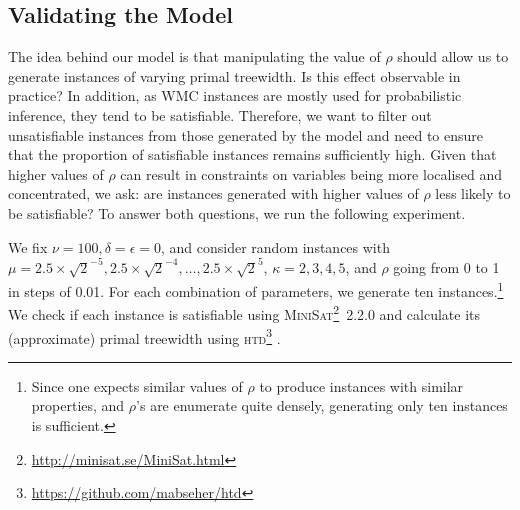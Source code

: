 



\subsection{Validating the Model}\label{sec:remarks}

The idea behind our model is that manipulating the value of $\rho$ should allow
us to generate instances of varying primal treewidth. Is this effect observable
in practice? In addition, as WMC instances are mostly used for probabilistic
inference, they tend to be satisfiable. Therefore, we want to filter out
unsatisfiable instances from those generated by the model and need to ensure
that the proportion of satisfiable instances remains sufficiently high. Given
that higher values of $\rho$ can result in constraints on variables being more
localised and concentrated, we ask: are instances generated with higher values
of $\rho$ less likely to be satisfiable? To answer both questions, we run the
following experiment.

\begin{experiment}\label{exp:regular_satisfiability}
  We fix $\nu = 100, \delta = \epsilon = 0$, and consider random instances with
  $\mu = 2.5 \times \sqrt{2}^{-5}, 2.5 \times \sqrt{2}^{-4}, \dots, 2.5 \times
  \sqrt{2}^5$, $\kappa = 2, 3, 4, 5$, and $\rho$ going from 0 to 1 in steps of
  0.01. For each combination of parameters, we generate ten instances.\footnote{Since one expects similar values of $\rho$ to produce instances with similar properties, and $\rho$'s are enumerate quite densely, generating only ten instances is sufficient.} We check if each instance is satisfiable using \textsc{MiniSat}\footnote{\url{http://minisat.se/MiniSat.html}}~2.2.0 \citep{DBLP:conf/sat/EenS03} and calculate its (approximate) primal treewidth using \textsc{htd}\footnote{\url{https://github.com/mabseher/htd}} \citep{DBLP:conf/cpaior/AbseherMW17}.
\end{experiment}

